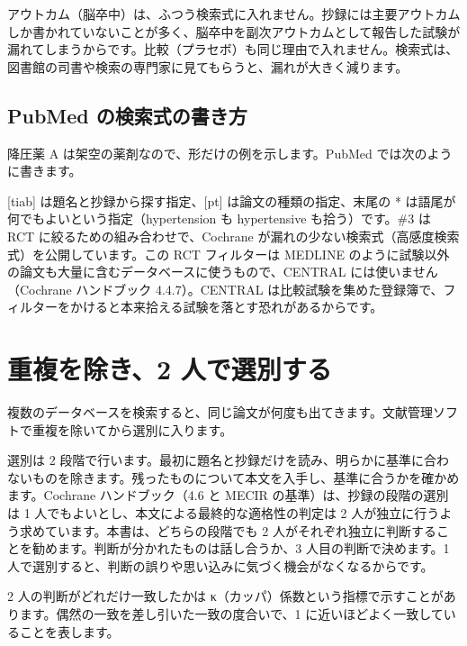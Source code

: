 アウトカム（脳卒中）は、ふつう検索式に入れません。抄録には主要アウトカムしか書かれていないことが多く、脳卒中を副次アウトカムとして報告した試験が漏れてしまうからです。比較（プラセボ）も同じ理由で入れません。検索式は、図書館の司書や検索の専門家に見てもらうと、漏れが大きく減ります。

\subsection{\hatten PubMed の検索式の書き方}
\label{sec:03-2-1}

降圧薬 A は架空の薬剤なので、形だけの例を示します。PubMed では次のように書きます。


[tiab] は題名と抄録から探す指定、[pt] は論文の種類の指定、末尾の * は語尾が何でもよいという指定（hypertension も hypertensive も拾う）です。\#3 は RCT に絞るための組み合わせで、Cochrane が漏れの少ない検索式（高感度検索式）を公開しています。この RCT フィルターは MEDLINE のように試験以外の論文も大量に含むデータベースに使うもので、CENTRAL には使いません（Cochrane ハンドブック 4.4.7）。CENTRAL は比較試験を集めた登録簿で、フィルターをかけると本来拾える試験を落とす恐れがあるからです。

\section{重複を除き、2 人で選別する}
\label{sec:03-3}

複数のデータベースを検索すると、同じ論文が何度も出てきます。文献管理ソフトで重複を除いてから選別に入ります。

選別は 2 段階で行います。最初に題名と抄録だけを読み、明らかに基準に合わないものを除きます。残ったものについて本文を入手し、基準に合うかを確かめます。Cochrane ハンドブック（4.6 と MECIR の基準）は、抄録の段階の選別は 1 人でもよいとし、本文による最終的な適格性の判定は 2 人が独立に行うよう求めています。本書は、どちらの段階でも 2 人がそれぞれ独立に判断することを勧めます。判断が分かれたものは話し合うか、3 人目の判断で決めます。1 人で選別すると、判断の誤りや思い込みに気づく機会がなくなるからです。

\begin{hattenbox}
2 人の判断がどれだけ一致したかは κ（カッパ）係数という指標で示すことがあります。偶然の一致を差し引いた一致の度合いで、1 に近いほどよく一致していることを表します。
\end{hattenbox}


